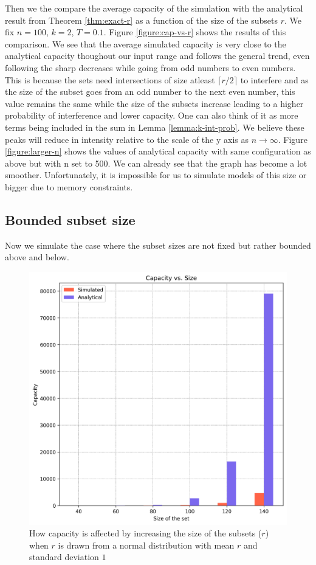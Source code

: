 Then we the compare the average capacity of the simulation with the analytical result from Theorem \ref{thm:exact-r} as a function of the size of the subsets $r$. We fix $n=100$, $k=2$, $T=0.1$. Figure \ref{figure:cap-vs-r} shows the results of this comparison. We see that the average simulated capacity is very close to the analytical capacity thoughout our input range and follows the general trend, even following the sharp decreases while going from odd numbers to even numbers. This is because the sets need intersections of size atleast $\lceil r/2 \rceil$ to interfere and as the size of the subset goes from an odd number to the next even number, this value remains the same while the size of the subsets increase leading to a higher probability of interference and lower capacity. One can also think of it as more terms being included in the sum in Lemma \ref{lemma:k-int-prob}. We believe these peaks will reduce in intensity relative to the scale of the y axis as $n \to \infty$. Figure \ref{figure:larger-n} shows the values of analytical capacity with same configuration as above but with n set to 500. We can already see that the graph has become a lot smoother. Unfortunately, it is impossible for us to simulate models of this size or bigger due to memory constraints. 

\subsection{Bounded subset size}
Now we simulate the case where the subset sizes are not fixed but rather bounded above and below. 

\begin{figure}%
    \centering
    \includegraphics[scale=0.82]{figures/cap-vs-n-bounded.png}
    \caption[Capacity vs. Size of the set ($n$)]{How capacity is affected by increasing the size of the subsets ($r$) when $r$ is drawn from a normal distribution with mean $r$ and standard deviation $1$}
    \label{figure:cap-vs-n-bounded}
    \end{figure}

